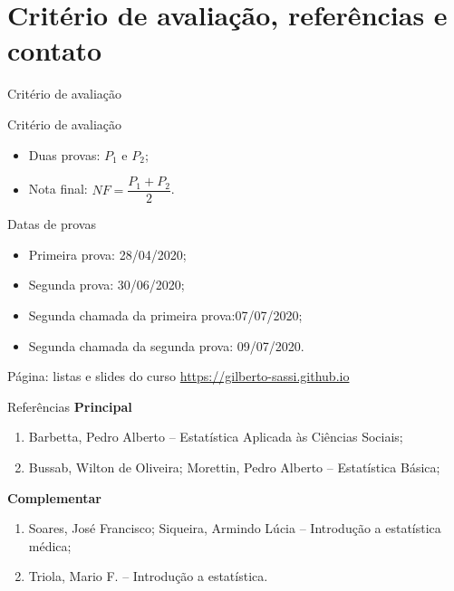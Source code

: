 \documentclass[9pt]{beamer}
\begin{document}
\section{Critério de avaliação, referências e contato}
\begin{frame}{Critério de avaliação}
\begin{block}{Critério de avaliação}
  \begin{itemize}
  \item Duas provas: $P_1$ e $P_2$;
  \item Nota final: $NF = \dfrac{P_1+P_2}{2}$.
 \end{itemize}
\end{block}

\vfill

\begin{block}{Datas de provas}
 \begin{itemize}
  \item Primeira prova: 28/04/2020;
  \item Segunda prova: 30/06/2020;
  \item Segunda chamada da primeira prova:07/07/2020;
  \item Segunda chamada da segunda prova: 09/07/2020.
 \end{itemize}
\end{block} 

\vfill

\begin{block}{Página: listas e slides do curso}
 \url{https://gilberto-sassi.github.io}
\end{block}


\end{frame}


\begin{frame}{Referências}
\textbf{Principal}
 \begin{enumerate}
  \item Barbetta, Pedro Alberto -- Estatística Aplicada às Ciências Sociais;
  \item Bussab, Wilton de Oliveira; Morettin, Pedro Alberto -- Estatística Básica;
 \end{enumerate}

 \vfill
 
\textbf{Complementar}
 \begin{enumerate}
  \item Soares, José Francisco; Siqueira, Armindo Lúcia -- Introdução a estatística médica;
  \item Triola, Mario F. -- Introdução a estatística.
 \end{enumerate}
\end{frame}
\end{document}
